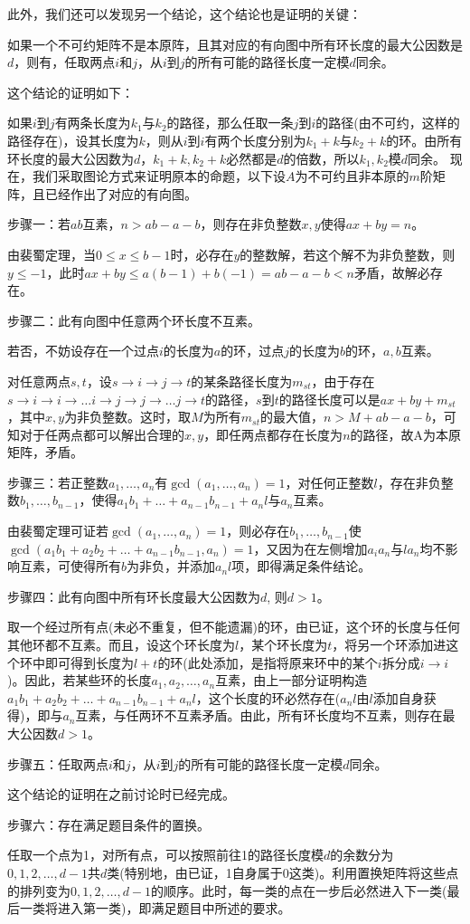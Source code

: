 \documentclass[a4paper,UTF8,fontset=windows]{ctexart}
\begin{document}
\begin{enumerate}
此外，我们还可以发现另一个结论，这个结论也是证明的关键：

如果一个不可约矩阵不是本原阵，且其对应的有向图中所有环长度的最大公因数是$d$，则有，任取两点$i$和$j$，从$i$到$j$的所有可能的路径长度一定模$d$同余。

这个结论的证明如下：

如果$i$到$j$有两条长度为$k_1$与$k_2$的路径，那么任取一条$j$到$i$的路径(由不可约，这样的路径存在)，设其长度为$k$，则从$i$到$i$有两个长度分别为$k_1+k$与$k_2+k$的环。由所有环长度的最大公因数为$d$，$k_1+k,k_2+k$必然都是$d$的倍数，所以$k_1,k_2$模$d$同余。
现在，我们采取图论方式来证明原本的命题，以下设$A$为不可约且非本原的$m$阶矩阵，且已经作出了对应的有向图。

步骤一：若$ab$互素，$n>ab-a-b$，则存在非负整数$x,y$使得$ax+by=n$。

由裴蜀定理，当$0\le x\le b-1$时，必存在$y$的整数解，若这个解不为非负整数，则$y\le-1$，此时$ax+by\le a(b-1)+b(-1)=ab-a-b<n$矛盾，故解必存在。

步骤二：此有向图中任意两个环长度不互素。

若否，不妨设存在一个过点$i$的长度为$a$的环，过点$j$的长度为$b$的环，$a,b$互素。

对任意两点$s,t$，设$s\to i\to j\to t$的某条路径长度为$m_{st}$，由于存在$s\to i\to i\to\dots i\to j\to j\to\dots j\to t$的路径，$s$到$t$的路径长度可以是$ax+by+m_{st}$，其中$x,y$为非负整数。这时，取$M$为所有$m_{st}$的最大值，$n>M+ab-a-b$，可知对于任两点都可以解出合理的$x,y$，即任两点都存在长度为$n$的路径，故A为本原矩阵，矛盾。

步骤三：若正整数$a_1,\dots,a_n$有$\gcd(a_1,\dots,a_n)=1$，对任何正整数$l$，存在非负整数$b_1,\dots,b_{n-1}$，使得$a_1b_1+\dots+a_{n-1}b_{n-1}+a_nl$与$a_n$互素。

由裴蜀定理可证若$\gcd(a_1,\dots,a_n)=1$，则必存在$b_1,\dots,b_{n-1}$使$\gcd(a_1b_1+a_2b_2+\dots+a_{n-1}b_{n-1},a_n)=1$，又因为在左侧增加$a_ia_n$与$la_n$均不影响互素，可使得所有$b$为非负，并添加$a_nl$项，即得满足条件结论。

步骤四：此有向图中所有环长度最大公因数为$d$, 则$d>1$。

取一个经过所有点(未必不重复，但不能遗漏)的环，由已证，这个环的长度与任何其他环都不互素。而且，设这个环长度为$l$，某个环长度为$t$，将另一个环添加进这个环中即可得到长度为$l+t$的环(此处添加，是指将原来环中的某个$i$拆分成$i\to i$)。因此，若某些环的长度$a_1,a_2,\dots,a_n$互素，由上一部分证明构造$a_1b_1+a_2b_2+\dots+a_{n-1}b_{n-1}+a_nl$，这个长度的环必然存在($a_nl$由$l$添加自身获得)，即与$a_n$互素，与任两环不互素矛盾。由此，所有环长度均不互素，则存在最大公因数$d>1$。

步骤五：任取两点$i$和$j$，从$i$到$j$的所有可能的路径长度一定模$d$同余。

这个结论的证明在之前讨论时已经完成。

步骤六：存在满足题目条件的置换。

任取一个点为1，对所有点，可以按照前往1的路径长度模$d$的余数分为$0,1,2,\dots,d-1$共$d$类(特别地，由已证，1自身属于0这类)。利用置换矩阵将这些点的排列变为$0,1,2,\dots,d-1$的顺序。此时，每一类的点在一步后必然进入下一类(最后一类将进入第一类)，即满足题目中所述的要求。
\end{enumerate}
\end{document}
